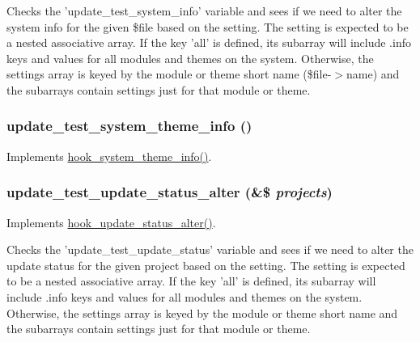 Checks the 'update\_\-test\_\-system\_\-info' variable and sees if we need to alter the system info for the given \$file based on the setting. The setting is expected to be a nested associative array. If the key 'all' is defined, its subarray will include .info keys and values for all modules and themes on the system. Otherwise, the settings array is keyed by the module or theme short name (\$file-\/$>$name) and the subarrays contain settings just for that module or theme. \hypertarget{update__test_8module_a1bb6e769b5cda51dd3ef92371eaae330}{
\subsubsection[{update\_\-test\_\-system\_\-theme\_\-info}]{\setlength{\rightskip}{0pt plus 5cm}update\_\-test\_\-system\_\-theme\_\-info ()}}
\label{update__test_8module_a1bb6e769b5cda51dd3ef92371eaae330}
Implements \hyperlink{group__hooks_gaf21de71044d5a79bde481d2383e12c9a}{hook\_\-system\_\-theme\_\-info()}. \hypertarget{update__test_8module_a0a00098ba4eca8497f9144d6ea6f9160}{
\subsubsection[{update\_\-test\_\-update\_\-status\_\-alter}]{\setlength{\rightskip}{0pt plus 5cm}update\_\-test\_\-update\_\-status\_\-alter (\&\$ {\em projects})}}
\label{update__test_8module_a0a00098ba4eca8497f9144d6ea6f9160}
Implements \hyperlink{group__hooks_ga62b22dcd7e2e14b061cedd46a7862352}{hook\_\-update\_\-status\_\-alter()}.

Checks the 'update\_\-test\_\-update\_\-status' variable and sees if we need to alter the update status for the given project based on the setting. The setting is expected to be a nested associative array. If the key 'all' is defined, its subarray will include .info keys and values for all modules and themes on the system. Otherwise, the settings array is keyed by the module or theme short name and the subarrays contain settings just for that module or theme. 